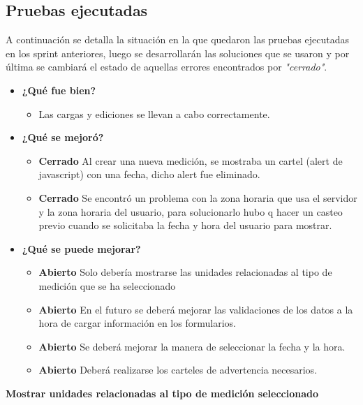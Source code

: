 \documentclass[a4paper,12pt]{article}
\begin{document}
\subsection{Pruebas ejecutadas}
A continuación se detalla la situación en la que quedaron las pruebas ejecutadas en los sprint anteriores, luego se desarrollarán las soluciones que se usaron y por última se cambiará el estado de aquellas errores encontrados por \textit{"cerrado"}.
	\begin{itemize}
		\item \textbf{¿Qué fue bien?}
        	\begin{itemize}
				\item        Las cargas y ediciones se llevan a cabo correctamente.
			\end{itemize}

   		\item \textbf{¿Qué se mejoró?}
        	\begin{itemize}
				\item \textbf{Cerrado} Al crear una nueva medición, se mostraba un cartel (alert de javascript) con una fecha, dicho alert fue eliminado.
                \item \textbf{Cerrado} Se encontró un problema con la zona horaria que usa el servidor y la zona horaria del usuario, para solucionarlo hubo q hacer un casteo previo cuando se solicitaba la fecha y hora del usuario para mostrar.
			\end{itemize}

   		\item \textbf{¿Qué se puede mejorar?}
        	\begin{itemize}
		        \item \textbf{Abierto} Solo debería mostrarse las unidades relacionadas al tipo de medición que se ha seleccionado 
				\item \textbf{Abierto} En el futuro se deberá mejorar las validaciones de los datos a la hora de cargar información en los formularios.
        		\item \textbf{Abierto} Se deberá mejorar la manera de seleccionar la fecha y la hora. 
                \item \textbf{Abierto} Deberá realizarse los carteles de advertencia necesarios.
            \end{itemize}
       
	\end{itemize}

\textbf{Mostrar unidades relacionadas al tipo de medición seleccionado}
\end{document}
